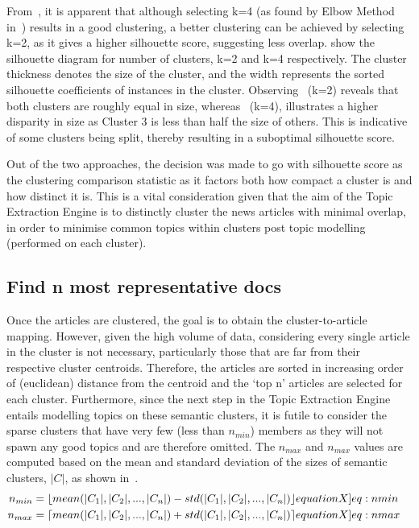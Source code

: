 \vspace*{-1.5ex}
From~, it is apparent that although selecting k=4 (as found by Elbow Method in~) results in a good clustering, a better clustering can be achieved by selecting k=2, as it gives a higher silhouette score, suggesting less overlap.  show the silhouette diagram for number of clusters, k=2 and k=4 respectively. The cluster thickness denotes the size of the cluster, and the width represents the sorted silhouette coefficients of instances in the cluster. Observing~ (k=2) reveals that both clusters are roughly equal in size, whereas~ (k=4), illustrates a higher disparity in size as Cluster 3 is less than half the size of others. This is indicative of some clusters being split, thereby resulting in a suboptimal silhouette score. 

Out of the two approaches, the decision was made to go with silhouette score as the clustering comparison statistic as it factors both how compact a cluster is and how distinct it is. This is a vital consideration given that the aim of the Topic Extraction Engine is to distinctly cluster the news articles with minimal overlap, in order to minimise common topics within clusters post topic modelling (performed on each cluster). 

\subsection*{Find n most representative docs} \label{sec:Find_n_docs}

Once the articles are clustered, the goal is to obtain the cluster-to-article mapping. However, given the high volume of data, considering every single article in the cluster is not necessary, particularly those that are far from their respective cluster centroids. Therefore, the articles are sorted in increasing order of (euclidean) distance from the centroid and the `top n' articles are selected for each cluster. Furthermore, since the next step in the Topic Extraction Engine entails modelling topics on these semantic clusters, it is futile to consider the sparse clusters that have very few (less than $n_{min}$) members as they will not spawn any good topics and are therefore omitted. The $n_{max}$ and $n_{max}$ values are computed based on the mean and standard deviation of the sizes of semantic clusters, $|C|$, as shown in~.
\vspace{-1.5px}
\begin{align}
  n_{min} &= \lfloor mean(|C_1|, |C_2|, ..., |C_n|) - std(|C_1|, |C_2|, ..., |C_n|) \rfloor \label[equationX]{eq:nmin} &\\
  n_{max} &= \lceil mean(|C_1|, |C_2|, ..., |C_n|) + std(|C_1|, |C_2|, ..., |C_n|) \rceil \label[equationX]{eq:nmax}
\end{align}


